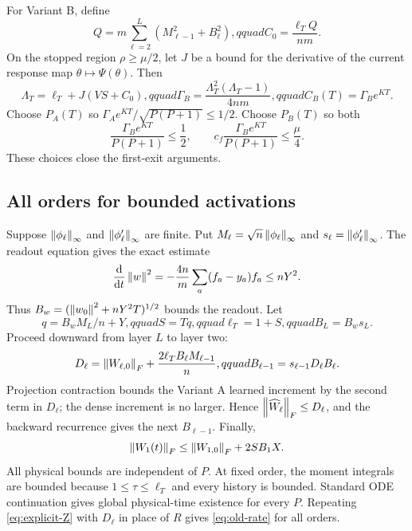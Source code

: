For Variant B, define
\begin{equation}
 Q=m\sum_{\ell=2}^L(M_{\ell-1}^2+B_\ell^2),qquad
 C_0=\frac{\ell_TQ}{nm}.
\end{equation}
On the stopped region $\rho\ge\mu/2$, let $J$ be a bound for the derivative
of the current response map $\theta\mapsto\Psi(\theta)$.  Then
\begin{equation}
 \Lambda_T=\ell_T+J(VS+C_0),qquad
 \Gamma_B=\frac{\Lambda_T^2(\Lambda_T-1)}{4nm},qquad
 C_B(T)=\Gamma_Be^{KT}.
 \label{eq:explicit-GammaB}
\end{equation}
Choose $P_A(T)$ so
$\Gamma_Ae^{KT}/\sqrt{P(P+1)}\le1/2$.  Choose $P_B(T)$ so both
\begin{equation}
 \frac{\Gamma_Be^{KT}}{P(P+1)}\le\frac12,
 \qquad
 c_f\frac{\Gamma_Be^{KT}}{P(P+1)}\le\frac\mu4.
\end{equation}
These choices close the first-exit arguments.

\subsection{All orders for bounded activations}

Suppose $\left\lVert \phi_\ell\right\rVert_\infty$ and
$\left\lVert \phi_\ell'\right\rVert_\infty$ are finite.  Put
$M_\ell=\sqrt n\left\lVert \phi_\ell\right\rVert_\infty$ and
$s_\ell=\left\lVert \phi_\ell'\right\rVert_\infty$.  The readout equation gives the exact
estimate
\begin{equation}
 \frac{\mathop{}\!\mathrm d}{\mathop{}\!\mathrm d t}\left\lVert w\right\rVert^2
 =-\frac{4n}{m}\sum_a(f_a-y_a)f_a
 \le nY^2.
\end{equation}
Thus $B_w=(\left\lVert w_0\right\rVert^2+nY^2T)^{1/2}$ bounds the readout.  Let
\begin{equation}
 q=B_wM_L/n+Y,qquad S=Tq,qquad \ell_T=1+S,qquad B_L=B_ws_L.
\end{equation}
Proceed downward from layer $L$ to layer two:
\begin{equation}
 D_\ell=\left\lVert W_{\ell,0}\right\rVert_F+
 \frac{2\ell_TB_\ell M_{\ell-1}}n,qquad
 B_{\ell-1}=s_{\ell-1}D_\ell B_\ell.
 \label{eq:bounded-downward}
\end{equation}
Projection contraction bounds the Variant A learned increment by the second
term in $D_\ell$; the dense increment is no larger.  Hence
$\left\lVert \widehat W_\ell\right\rVert_F\le D_\ell$, and the backward recurrence gives the next
$B_{\ell-1}$.  Finally,
\begin{equation}
 \left\lVert W_1(t)\right\rVert_F\le\left\lVert W_{1,0}\right\rVert_F+2SB_1X.
\end{equation}
All physical bounds are independent of $P$.  At fixed order, the moment
integrals are bounded because $1\le\tau\le\ell_T$ and every history is
bounded.  Standard ODE continuation gives global physical-time existence for
every $P$.  Repeating \eqref{eq:explicit-Z} with $D_\ell$ in place of $R$
gives \eqref{eq:old-rate} for all orders.

